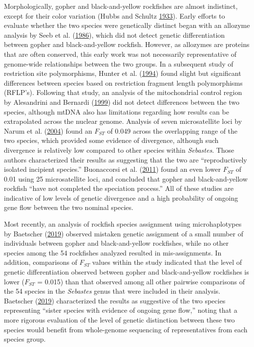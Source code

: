 \documentclass[12pt,]{article}
\begin{document}
Morphologically, gopher and black-and-yellow rockfishes are almost
indistinct, except for their color variation (Hubbs and Schultz
\protect\hyperlink{ref-Hubbs1933}{1933}). Early efforts to evaluate
whether the two species were genetically distinct began with an allozyme
analysis by Seeb et al. (\protect\hyperlink{ref-Seeb1986}{1986}), which
did not detect genetic differentiation between gopher and
black-and-yellow rockfish. However, as allozymes are proteins that are
often conserved, this early work was not necessarily representative of
genome-wide relationships between the two groups. In a subsequent study
of restriction site polymorphisms, Hunter et al.
(\protect\hyperlink{ref-Hunter1994}{1994}) found slight but significant
differences between species based on restriction fragment length
polymorphisms (RFLP's). Following that study, an analysis of the
mitochondrial control region by Alesandrini and Bernardi
(\protect\hyperlink{ref-Alesandrini1999}{1999}) did not detect
differences between the two species, although mtDNA also has limitations
regarding how results can be extrapolated across the nuclear genome.
Analysis of seven microsatellite loci by Narum et al.
(\protect\hyperlink{ref-Narum2004}{2004}) found an \(F_{ST}\) of 0.049
across the overlapping range of the two species, which provided some
evidence of divergence, although such divergence is relatively low
compared to other species within \emph{Sebastes}. Those authors
characterized their results as suggesting that the two are
``reproductively isolated incipient species.'' Buonaccorsi et al.
(\protect\hyperlink{ref-Buonaccorsi2011}{2011}) found an even lower
\(F_{ST}\) of 0.01 using 25 microsatellite loci, and concluded that
gopher and black-and-yellow rockfish ``have not completed the speciation
process.'' All of these studies are indicative of low levels of genetic
divergence and a high probability of ongoing gene flow between the two
nominal species.

Most recently, an analysis of rockfish species assignment using
microhaplotypes by Baetscher
(\protect\hyperlink{ref-Baetscher2019}{2019}) observed mistaken genetic
assignment of a small number of individuals between gopher and
black-and-yellow rockfishes, while no other species among the 54
rockfishes analyzed resulted in mis-assignments. In addition,
comparisons of \(F_{ST}\) values within the study indicated that the
level of genetic differentiation observed between gopher and
black-and-yellow rockfishes is lower (\(F_{ST}\) = 0.015) than that
observed among all other pairwise comparisons of the 54 species in the
\emph{Sebastes} genus that were included in their analysis. Baetscher
(\protect\hyperlink{ref-Baetscher2019}{2019}) characterized the results
as suggestive of the two species representing ``sister species with
evidence of ongoing gene flow,'' noting that a more rigorous evaluation
of the level of genetic distinction between these two species would
benefit from whole-genome sequencing of representatives from each
species group.
\end{document}
